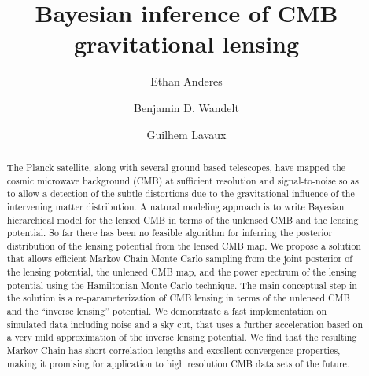 \documentclass[iop,revtex4,apj,onecolumn]{emulateapj}
\begin{document}
\title{Bayesian inference of CMB gravitational lensing}

\author{Ethan Anderes}

\author{Benjamin D. Wandelt}
\author{Guilhem Lavaux}



\begin{abstract} 
The Planck satellite, along with several ground based telescopes, have mapped the  cosmic microwave background (CMB) at sufficient resolution and signal-to-noise so as to allow a detection of the subtle distortions  due to the gravitational influence of the intervening  matter distribution. A natural modeling approach is to write Bayesian hierarchical model for the lensed CMB in terms of the unlensed CMB and the lensing potential. So far there has been no feasible algorithm for inferring the posterior distribution of the lensing potential from the lensed CMB map. We propose a solution that allows efficient Markov Chain Monte Carlo sampling from the joint posterior of the lensing potential, the unlensed CMB map, and the power spectrum of the lensing potential using the Hamiltonian Monte Carlo technique. The main conceptual step in the solution is  a re-parameterization of CMB lensing in terms of the unlensed CMB and the ``inverse lensing'' potential. We demonstrate a fast implementation on simulated data including noise and a sky cut, that uses a further acceleration based on a very mild approximation of the inverse lensing potential.  We find that the resulting Markov Chain has short correlation lengths and excellent convergence properties, making it promising for application to high resolution CMB data sets of the future.

\end{abstract}
\end{document}
